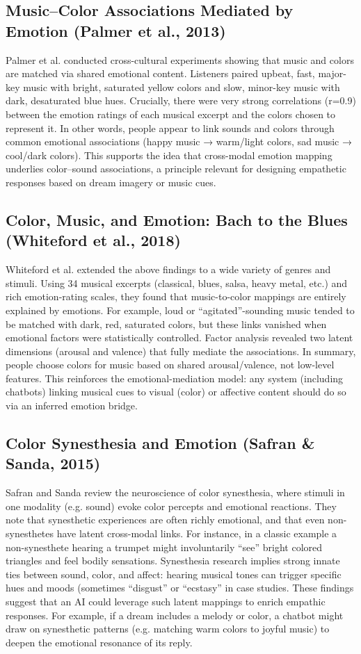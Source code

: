 \documentclass[conference]{IEEEtran}
\begin{document}
    \subsection{Music–Color Associations Mediated by Emotion (Palmer et al., 2013)}
	Palmer et al. conducted cross-cultural experiments showing that music and colors are matched via shared emotional content. Listeners paired upbeat, fast, major-key music with bright, saturated yellow colors and slow, minor-key music with dark, desaturated blue hues. Crucially, there were very strong correlations (r=0.9) between the emotion ratings of each musical excerpt and the colors chosen to represent it. In other words, people appear to link sounds and colors through common emotional associations (happy music → warm/light colors, sad music → cool/dark colors). This supports the idea that cross-modal emotion mapping underlies color–sound associations, a principle relevant for designing empathetic responses based on dream imagery or music cues.

    \subsection{Color, Music, and Emotion: Bach to the Blues (Whiteford et al., 2018)}
    Whiteford et al. extended the above findings to a wide variety of genres and stimuli. Using 34 musical excerpts (classical, blues, salsa, heavy metal, etc.) and rich emotion-rating scales, they found that music-to-color mappings are entirely explained by emotions.  For example, loud or “agitated”-sounding music tended to be matched with dark, red, saturated colors, but these links vanished when emotional factors were statistically controlled. Factor analysis revealed two latent dimensions (arousal and valence) that fully mediate the associations. In summary, people choose colors for music based on shared arousal/valence, not low-level features. This reinforces the emotional-mediation model: any system (including chatbots) linking musical cues to visual (color) or affective content should do so via an inferred emotion bridge.

    \subsection{Color Synesthesia and Emotion (Safran & Sanda, 2015)}
    Safran and Sanda review the neuroscience of color synesthesia, where stimuli in one modality (e.g. sound) evoke color percepts and emotional reactions. They note that synesthetic experiences are often richly emotional, and that even non-synesthetes have latent cross-modal links. For instance, in a classic example a non-synesthete hearing a trumpet might involuntarily “see” bright colored triangles and feel bodily sensations.  Synesthesia research implies strong innate ties between sound, color, and affect: hearing musical tones can trigger specific hues and moods (sometimes “disgust” or “ecstasy” in case studies. These findings suggest that an AI could leverage such latent mappings to enrich empathic responses. For example, if a dream includes a melody or color, a chatbot might draw on synesthetic patterns (e.g. matching warm colors to joyful music) to deepen the emotional resonance of its reply.
\end{document}
